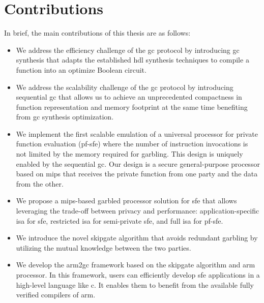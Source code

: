 \section{Contributions}
In brief, the main contributions of this thesis are as follows:
\begin{itemize}
  \item
  We address the efficiency challenge of the gc protocol by introducing \acrshort{gc} synthesis that adapts the established \acrshort{hdl} synthesis techniques to compile a function into an optimize Boolean circuit.

  \item
  We address the scalability challenge of the \acrshort{gc} protocol by introducing sequential \acrshort{gc} that allows us to achieve an unprecedented compactness in function representation and memory footprint at the same time benefiting from \acrshort{gc} synthesis optimization.

  \item
  We implement the first scalable emulation of a universal processor for private function evaluation (\acrshort{pf-sfe}) where the number of instruction invocations is not limited by the memory required for garbling.
  This design is uniquely enabled by the sequential \acrshort{gc}.
  Our design is a secure general-purpose processor based on \gls{mips} that receives the private function from one party and the data from the other.

  \item
  We propose a \gls{mips}-based garbled processor solution for \acrshort{sfe} that allows leveraging the trade-off between privacy and performance: application-specific \acrshort{isa} for \acrshort{sfe}, restricted \acrshort{isa} for semi-private \acrshort{sfe}, and full \acrshort{isa} for \acrshort{pf-sfe}.

  \item We introduce the novel \gls{skipgate} algorithm that avoids redundant garbling by utilizing the mutual knowledge between the two parties.

  \item
  We develop the \gls{arm2gc} framework based on the \gls{skipgate} algorithm and \gls{arm} processor.
  In this framework, users can efficiently develop \acrshort{sfe} applications in a high-level language like \gls{c}.
  It enables them to benefit from the available fully verified compilers of \gls{arm}.
\end{itemize}

